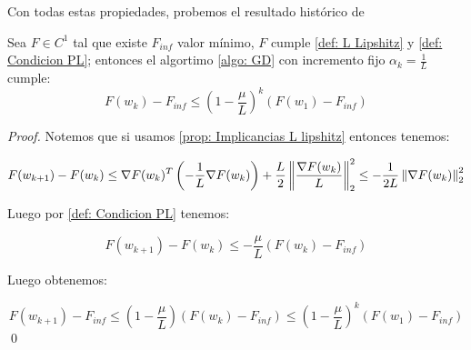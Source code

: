 Con todas estas propiedades, probemos el resultado hist\'orico de  \cite{polyak:1963}

\begin{theorem}
	\label{theorem: convergencia lineal GD}
	Sea $F \in C^1$ tal que existe $F_{inf}$ valor m\'inimo, $F$ cumple \ref{def: L Lipshitz} y \ref{def: Condicion PL}; entonces el algortimo \ref{algo: GD} con incremento fijo $\alpha_k = \frac{1}{L}$ cumple:
	\begin{equation}
	F(w_k) - F_{inf} \leq \left(1 - \frac{\mu}{L}\right)^k \left(F(w_1) - F_{inf}\right)
	\end{equation}
\end{theorem}

\begin{proof}
	Notemos que si usamos \ref{prop: Implicancias L lipshitz} entonces tenemos:
	
	\begin{equation*}
		F(w_{k+1}) - F(w_k) \leq \nabla F(w_k)^T \left(-\frac{1}{L} \nabla F(w_k)\right) + \frac{L}{2} \left\lVert\frac{\nabla F(w_k)}{L}\right\rVert_2^2 \leq -\frac{1}{2L} \left\lVert\nabla F(w_k)\right\rVert_2^2
	\end{equation*}
	
	Luego por \ref{def: Condicion PL} tenemos:
	
	\begin{equation*}
		F(w_{k+1}) - F(w_k) \leq - \frac{\mu}{L} \left(F(w_k) - F_{inf}\right)
	\end{equation*}
	
	Luego obtenemos:
	
	\begin{equation*}
	F(w_{k+1}) - F_{inf} \leq \left(1 - \frac{\mu}{L} \right) \left(F(w_k) - F_{inf}\right) \leq \left(1 - \frac{\mu}{L}\right)^k \left(F(w_1) - F_{inf}\right)
	\end{equation*}\qed
	
	
\end{proof}
